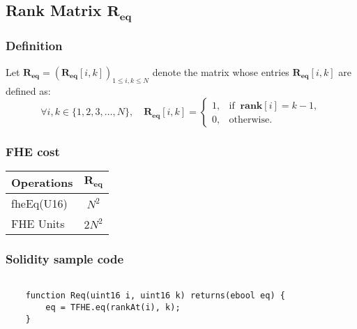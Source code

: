 
\subsection{Rank Matrix $\mathbf{R_{eq}}$}

\subsubsection{Definition}
Let $\mathbf{R_{eq}} = (\mathbf{R_{eq}}[i, k])_{1 \le i, k \le N}$ denote the matrix whose entries $\mathbf{R_{eq}}[i, k]$ are defined as:
\begin{equation*}
    \forall i, k \in \{1, 2, 3, \dots, N\}, \quad \mathbf{R_{eq}}[i, k] = 
    \begin{cases}
        1, & \text{if } \ \mathbf{rank}[i] = k - 1, \\
        0, & \text{otherwise}.
    \end{cases}
\end{equation*}

\subsubsection{FHE cost}

\renewcommand{\arraystretch}{1.5}
\begin{tabular}{ |l|c| }
    \hline    
    Operations & $\mathbf{R_{eq}}$ \\ 
    \hline
    fheEq(U16) & $N^2$  \\
    \hline
    \hline
    FHE Units & $2N^2$ \\
    \hline
\end{tabular}

\subsubsection{Solidity sample code}

\begin{lstlisting}[language=Solidity]

    function Req(uint16 i, uint16 k) returns(ebool eq) {
        eq = TFHE.eq(rankAt(i), k);
    }
  
\end{lstlisting}
  

